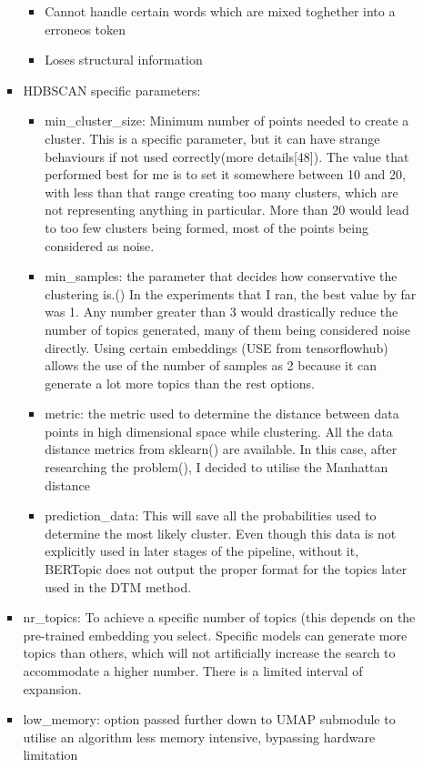 \documentclass[12pt,MSc,a4paper,oneside]{muthesis}
\begin{document}
\begin{itemize}
\begin{itemize}
\begin{itemize}
\begin{itemize}
                \item Cannot handle certain words which are mixed toghether into a erroneos token
                \item Loses structural information
              \end{itemize}
            \item HDBSCAN specific parameters:
              \begin{itemize}
                \item min\_cluster\_size: Minimum number of points needed to create a cluster. This is a specific parameter, but it can have strange behaviours if not used correctly(more details[48]). The value that performed best for me is to set it somewhere between 10 and 20, with less than that range creating too many clusters, which are not representing anything in particular. More than 20 would lead to too few clusters being formed, most of the points being considered as noise.
                \item min\_samples: the parameter that decides how conservative the clustering is.(\cite{McInnes2017}) In the experiments that I ran, the best value by far was 1. Any number greater than 3 would drastically reduce the number of topics generated, many of them being considered noise directly. Using certain embeddings (USE from tensorflowhub) allows the use of the number of samples as 2 because it can generate a lot more topics than the rest options.
                \item metric: the metric used to determine the distance between data points in high dimensional space while clustering. All the data distance metrics from sklearn(\cite{scikit-learn}) are available. In this case, after researching the problem(\cite{Aggarwal2001OnTS}), I decided to utilise the Manhattan distance
                \item prediction\_data: This will save all the probabilities used to determine the most likely cluster. Even though this data is not explicitly used in later stages of the pipeline, without it, BERTopic does not output the proper format for the topics later used in the DTM method.
              \end{itemize}
            \item nr\_topics: To achieve a specific number of topics (this depends on the pre-trained embedding you select. Specific models can generate more topics than others, which will not artificially increase the search to accommodate a higher number. There is a limited interval of expansion.
              \item low\_memory: option passed further down to UMAP submodule to utilise an algorithm less memory intensive, bypassing hardware limitation
            \end{itemize}
        \end{itemize}
    \end{itemize}
\end{document}
